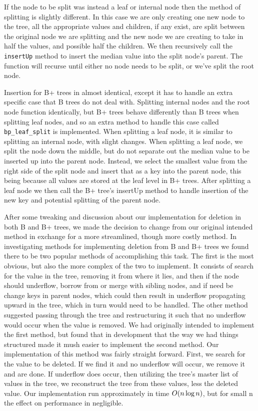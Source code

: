 If the node to be split was instead a leaf or internal node then the
method of splitting is slightly different.  In this case we are only
creating one new node to the tree, all the appropriate values and
children, if any exist, are split between the original node we are
splitting and the new node we are creating to take in half the values,
and possible half the children.  We then recursively call the
\texttt{insertUp} method to insert the median value into the split
node's parent.  The function will recurse until either no node needs
to be split, or we've split the root node.

Insertion for B+ trees in almost identical, except it has to handle an
extra specific case that B trees do not deal with.  Splitting internal
nodes and the root node function identically, but B+ trees behave
differently than B trees when splitting leaf nodes, and so an extra
method to handle this case called \texttt{bp\_leaf\_split} is
implemented.  When splitting a leaf node, it is similar to splitting
an internal node, with slight changes.  When splitting a leaf node, we
split the node down the middle, but do not separate out the median
value to be inserted up into the parent node.  Instead, we select the
smallest value from the right side of the split node and insert that
as a key into the parent node, this being because all values are
stored at the leaf level in B+ trees.  After splitting a leaf node we
then call the B+ tree's insertUp method to handle insertion of the new
key and potential splitting of the parent node.

After some tweaking and discussion about our implementation for
deletion in both B and B+ trees, we made the decision to change from
our original intended method in exchange for a more streamlined,
though more costly method.  In investigating methods for implementing
deletion from B and B+ trees we found there to be two popular methods
of accomplishing this task.  The first is the most obvious, but also
the more complex of the two to implement.  It consists of search for
the value in the tree, removing it from where it lies, and then if the
node should underflow, borrow from or merge with sibling nodes, and if
need be change keys in parent nodes, which could then result in
underflow propagating upward in the tree, which in turn would need to
be handled.  The other method suggested passing through the tree and
restructuring it such that no underflow would occur when the value is
removed.  We had originally intended to implement the first method,
but found that in development that the way we had things structured
made it mush easier to implement the second method.  Our
implementation of this method was fairly straight forward. First, we search
for the value to be deleted. If we find it and no underflow will
occur, we remove it and are done.  If underflow does occur, then
utilizing the tree's master list of values in the tree, we reconstruct
the tree from these values, less the deleted value.  Our
implementation run approximately in time $O(n \text{\,log\,} n)$, but for small n
the effect on performance in negligible.

